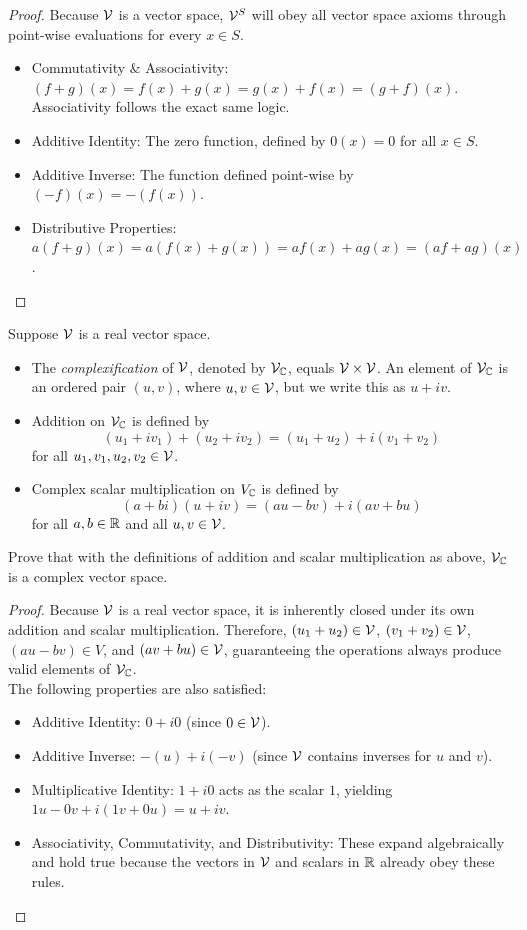 \begin{proof}
	Because $\mathcal{V}$ is a vector space, $\mathcal{V}^S$ will obey all vector space axioms through point-wise evaluations for every $x \in S$.
	\begin{itemize}
	\item Commutativity \& Associativity: $(f+g)(x) = f(x) + g(x) = g(x) + f(x) = (g+f)(x)$. Associativity follows the exact same logic.
	\item Additive Identity: The zero function, defined by $0(x) = 0$ for all $x \in S$.
	\item Additive Inverse: The function defined point-wise by $(-f)(x) = -(f(x))$.
	\item Distributive Properties: $a(f+g)(x) = a(f(x) + g(x)) = af(x) + ag(x) = (af + ag)(x)$.
\end{itemize}
\end{proof}
\begin{question}
	Suppose $\mathcal{V}$ is a real vector space.
	\begin{itemize}
		\item The \textit{complexification} of $\mathcal{V}$, denoted by $\mathcal{V}_{\mathbb{C}}$, equals $\mathcal{V} \times \mathcal{V}$. An element of $\mathcal{V}_{\mathbb{C}}$ is an ordered pair $(u, v)$, where $u, v \in \mathcal{V}$, but we write this as $u + iv$.
		\item Addition on $\mathcal{V}_{\mathbb{C}}$ is defined by
		\[
		(u_1 + iv_1) + (u_2 + iv_2) = (u_1 + u_2) + i(v_1 + v_2)
		\]
		for all $u_1, v_1, u_2, v_2 \in \mathcal{V}$.
		\item Complex scalar multiplication on $V_{\mathbb{C}}$ is defined by
		\[
		(a + bi)(u + iv) = (au - bv) + i(av + bu)
		\]
		for all $a, b \in \mathbb{R}$ and all $u, v \in \mathcal{V}$.
	\end{itemize}
	
	Prove that with the definitions of addition and scalar multiplication as above, $\mathcal{V}_{\mathbb{C}}$ is a complex vector space.
\end{question}
\begin{proof}
	Because $\mathcal{V}$ is a real vector space, it is inherently closed under its own addition and scalar multiplication. Therefore, $(u_1 + u_2) \in \mathcal{V}$, $(v_1 + v_2) \in \mathcal{V}$, $(au - bv) \in V$, and $(av + bu) \in \mathcal{V}$, guaranteeing the operations always produce valid elements of $\mathcal{V}_{\mathbb{C}}$. \\
	The following properties are also satisfied:\\
	\begin{itemize}
	\item Additive Identity: $0 + i0$ (since $0 \in \mathcal{V}$).
	\item Additive Inverse: $-(u) + i(-v)$ (since $\mathcal{V}$ contains inverses for $u$ and $v$).
	\item Multiplicative Identity: $1 + i0$ acts as the scalar $1$, yielding $1u - 0v + i(1v + 0u) = u + iv$.
	\item Associativity, Commutativity, and Distributivity: These expand algebraically and hold true because the vectors in $\mathcal{V}$ and scalars in $\mathbb{R}$ already obey these rules.
	\end{itemize}
\end{proof}
